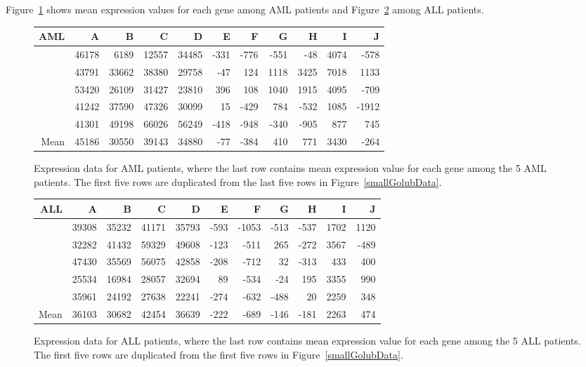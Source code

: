 Figure~\ref{golubSmallAml} shows mean expression values for each gene among AML patients and Figure~\ref{golubSmallAll} among ALL patients. 

\begin{figure}[ht]
	\small
	\centering
	\begin{tabular}{r|rrrrrrrrrr}
		\hline
		AML & A & B & C & D & E & F & G & H & I & J \\ 
		\hline
		& 46178 & 6189 & 12557 & 34485 & -331 & -776 & -551 & -48 & 4074 & -578 \\ 
		& 43791 & 33662 & 38380 & 29758 & -47 & 124 & 1118 & 3425 & 7018 & 1133 \\ 
		& 53420 & 26109 & 31427 & 23810 & 396 & 108 & 1040 & 1915 & 4095 & -709 \\ 
		& 41242 & 37590 & 47326 & 30099 & 15 & -429 & 784 & -532 & 1085 & -1912 \\ 
		& 41301 & 49198 & 66026 & 56249 & -418 & -948 & -340 & -905 & 877 & 745 \\ 
		\hline
		Mean & 45186 & 30550 & 39143 & 34880 & -77 & -384 & 410 & 771 & 3430 & -264 \\ 
		\hline
	\end{tabular}
	\caption{Expression data for AML patients, where the last row contains mean expression value for each gene among the 5 AML patients. The first five rows are duplicated from the last five rows in Figure~\ref{smallGolubData}.}
	\label{golubSmallAml}
\end{figure}

\begin{figure}[ht]
	\small
	\centering
	\begin{tabular}{r|rrrrrrrrrr}
		\hline
		ALL & A & B & C & D & E & F & G & H & I & J \\ 
		\hline
		& 39308 & 35232 & 41171 & 35793 & -593 & -1053 & -513 & -537 & 1702 & 1120 \\ 
		& 32282 & 41432 & 59329 & 49608 & -123 & -511 & 265 & -272 & 3567 & -489 \\ 
		& 47430 & 35569 & 56075 & 42858 & -208 & -712 & 32 & -313 & 433 & 400 \\ 
		& 25534 & 16984 & 28057 & 32694 & 89 & -534 & -24 & 195 & 3355 & 990 \\ 
		& 35961 & 24192 & 27638 & 22241 & -274 & -632 & -488 & 20 & 2259 & 348 \\ 
		\hline
		Mean & 36103 & 30682 & 42454 & 36639 & -222 & -689 & -146 & -181 & 2263 & 474 \\ 
		\hline
	\end{tabular}
	\caption{Expression data for ALL patients, where the last row contains mean expression value for each gene among the 5 ALL patients. The first five rows are duplicated from the first five rows in Figure~\ref{smallGolubData}.}
	\label{golubSmallAll}
\end{figure}

